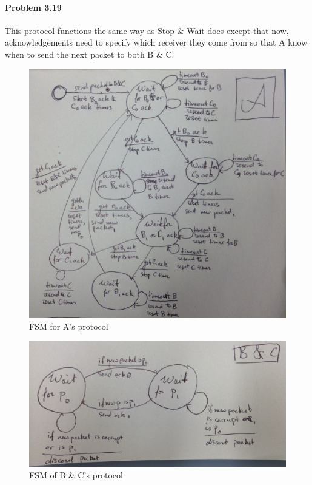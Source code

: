 \documentclass[12pt]{article}
\begin{document}
\paragraph{Problem 3.19}
This protocol functions the same way as Stop \& Wait does except that now, acknowledgements need to specify which receiver they come from so that A know when to send the next packet to both B \& C.
\begin{figure}[H]
	\caption{FSM for A's protocol}
	\centering
	\includegraphics[width=\textwidth,scale=0.3]{A}	
\end{figure}
\begin{figure}[H]
	\caption{FSM of B \& C's protocol}
	\centering
	\includegraphics[width=\textwidth]{BC}	
\end{figure}
\end{document}
